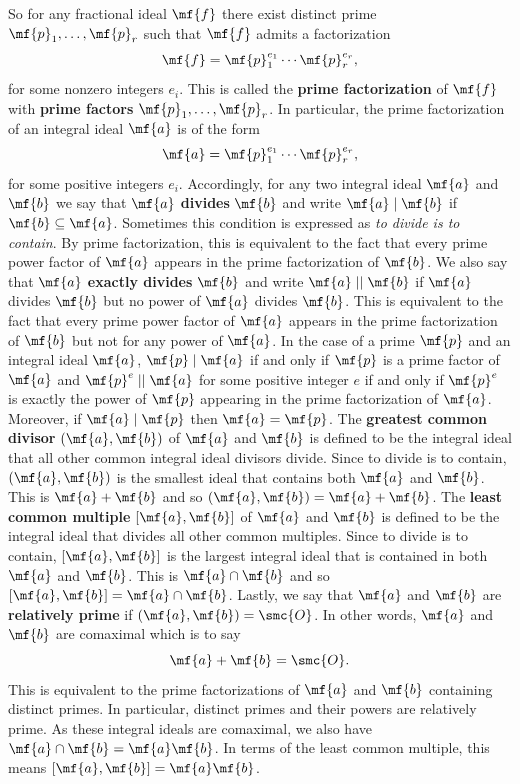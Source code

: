     So for any fractional ideal \(\mf{f}\) there exist distinct prime \(\mf{p}_{1},\ldots,\mf{p}_{r}\) such that \(\mf{f}\) admits a factorization
    \[
      \mf{f} = \mf{p}_{1}^{e_{1}} \cdots \mf{p}_{r}^{e_{r}},
    \]
    for some nonzero integers \(e_{i}\). This is called the \textbf{prime factorization} of \(\mf{f}\) with \textbf{prime factors} \(\mf{p}_{1},\ldots,\mf{p}_{r}\). In particular, the prime factorization of an integral ideal \(\mf{a}\) is of the form
    \[
      \mf{a} = \mf{p}_{1}^{e_{1}} \cdots \mf{p}_{r}^{e_{r}},
    \]
    for some positive integers \(e_{i}\). Accordingly, for any two integral ideal \(\mf{a}\) and \(\mf{b}\) we say that \(\mf{a}\) \textbf{divides} \(\mf{b}\) and write \(\mf{a} \mid \mf{b}\) if \(\mf{b} \subseteq \mf{a}\). Sometimes this condition is expressed as \textit{to divide is to contain}. By prime factorization, this is equivalent to the fact that every prime power factor of \(\mf{a}\) appears in the prime factorization of \(\mf{b}\). We also say that \(\mf{a}\) \textbf{exactly divides} \(\mf{b}\) and write \(\mf{a} \mid\mid \mf{b}\) if \(\mf{a}\) divides \(\mf{b}\) but no power of \(\mf{a}\) divides \(\mf{b}\). This is equivalent to the fact that every prime power factor of \(\mf{a}\) appears in the prime factorization of \(\mf{b}\) but not for any power of \(\mf{a}\). In the case of a prime \(\mf{p}\) and an integral ideal \(\mf{a}\), \(\mf{p} \mid \mf{a}\) if and only if \(\mf{p}\) is a prime factor of \(\mf{a}\) and \(\mf{p}^{e} \mid\mid \mf{a}\) for some positive integer \(e\) if and only if \(\mf{p}^{e}\) is exactly the power of \(\mf{p}\) appearing in the prime factorization of \(\mf{a}\). Moreover, if \(\mf{a} \mid \mf{p}\) then \(\mf{a} = \mf{p}\). The \textbf{greatest common divisor} \((\mf{a},\mf{b})\) of \(\mf{a}\) and \(\mf{b}\) is defined to be the integral ideal that all other common integral ideal divisors divide. Since to divide is to contain, \((\mf{a},\mf{b})\) is the smallest ideal that contains both \(\mf{a}\) and \(\mf{b}\). This is \(\mf{a}+\mf{b}\) and so \((\mf{a},\mf{b}) = \mf{a}+\mf{b}\). The \textbf{least common multiple} \([\mf{a},\mf{b}]\) of \(\mf{a}\) and \(\mf{b}\) is defined to be the integral ideal that divides all other common multiples. Since to divide is to contain, \([\mf{a},\mf{b}]\) is the largest integral ideal that is contained in both \(\mf{a}\) and \(\mf{b}\). This is \(\mf{a} \cap \mf{b}\) and so \([\mf{a},\mf{b}] = \mf{a} \cap \mf{b}\). Lastly, we say that \(\mf{a}\) and \(\mf{b}\) are \textbf{relatively prime} if \((\mf{a},\mf{b}) = \smc{O}\). In other words, \(\mf{a}\) and \(\mf{b}\) are comaximal which is to say
    \[
      \mf{a}+\mf{b} = \smc{O}.
    \]
    This is equivalent to the prime factorizations of \(\mf{a}\) and \(\mf{b}\) containing distinct primes. In particular, distinct primes and their powers are relatively prime. As these integral ideals are comaximal, we also have \(\mf{a} \cap \mf{b} = \mf{a}\mf{b}\). In terms of the least common multiple, this means \([\mf{a},\mf{b}] = \mf{a}\mf{b}\).
    
